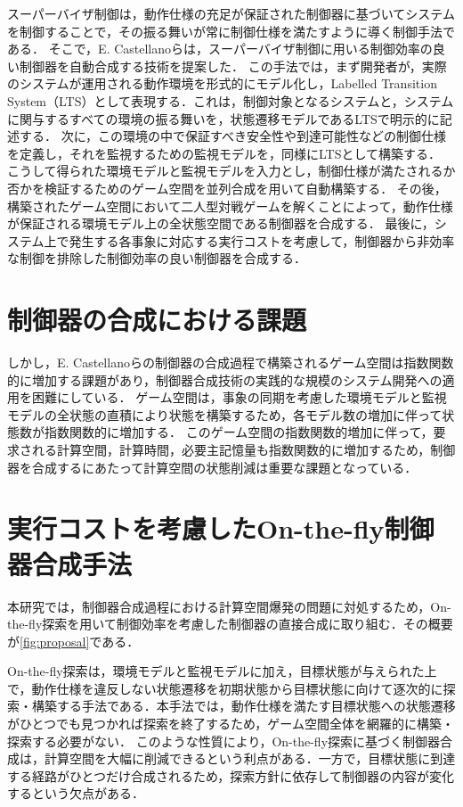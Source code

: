\documentclass[11pt]{jarticle}
\begin{document}
スーパーバイザ制御は，動作仕様の充足が保証された制御器に基づいてシステムを制御することで，その振る舞いが常に制御仕様を満たすように導く制御手法である．
そこで，E. Castellanoら\cite{eze}は，スーパーバイザ制御に用いる制御効率の良い制御器を自動合成する技術を提案した．
この手法では，まず開発者が，実際のシステムが運用される動作環境を形式的にモデル化し，Labelled Transition System（LTS）として表現する．これは，制御対象となるシステムと，システムに関与するすべての環境の振る舞いを，状態遷移モデルであるLTSで明示的に記述する．
次に，この環境の中で保証すべき安全性や到達可能性などの制御仕様を定義し，それを監視するための監視モデルを，同様にLTSとして構築する．
こうして得られた環境モデルと監視モデルを入力とし，制御仕様が満たされるか否かを検証するためのゲーム空間を並列合成を用いて自動構築する．
その後，構築されたゲーム空間において二人型対戦ゲームを解くことによって，動作仕様が保証される環境モデル上の全状態空間である制御器を合成する．
最後に，システム上で発生する各事象に対応する実行コストを考慮して，制御器から非効率な制御を排除した制御効率の良い制御器を合成する．


\section{制御器の合成における課題}
しかし，E. Castellanoら\cite{eze}の制御器の合成過程で構築されるゲーム空間は指数関数的に増加する課題があり，制御器合成技術の実践的な規模のシステム開発への適用を困難にしている．
ゲーム空間は，事象の同期を考慮した環境モデルと監視モデルの全状態の直積により状態を構築するため，各モデル数の増加に伴って状態数が指数関数的に増加する．
このゲーム空間の指数関数的増加に伴って，要求される計算空間，計算時間，必要主記憶量も指数関数的に増加するため，制御器を合成するにあたって計算空間の状態削減は重要な課題となっている．


\section{実行コストを考慮したOn-the-fly制御器合成手法}
本研究では，制御器合成過程における計算空間爆発の問題に対処するため，On-the-fly探索を用いて制御効率を考慮した制御器の直接合成に取り組む．その概要が\ref{fig:proposal}である．

On-the-fly探索\cite{ddcs}は，環境モデルと監視モデルに加え，目標状態が与えられた上で，動作仕様を違反しない状態遷移を初期状態から目標状態に向けて逐次的に探索・構築する手法である．本手法では，動作仕様を満たす目標状態への状態遷移がひとつでも見つかれば探索を終了するため，ゲーム空間全体を網羅的に構築・探索する必要がない．
このような性質により，On-the-fly探索に基づく制御器合成は，計算空間を大幅に削減できるという利点がある．一方で，目標状態に到達する経路がひとつだけ合成されるため，探索方針に依存して制御器の内容が変化するという欠点がある．
\end{document}
